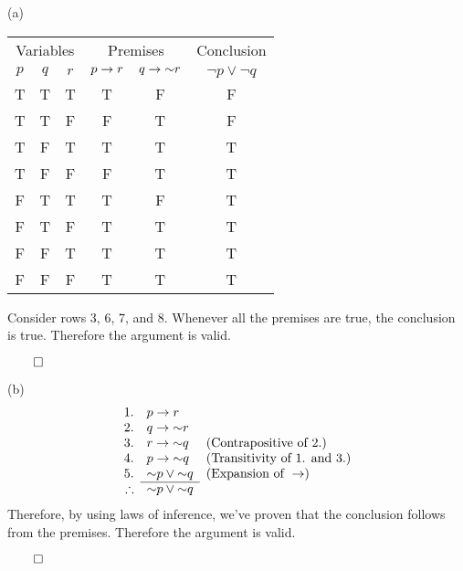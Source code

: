 \documentclass{report}
\begin{document}
\sol (a)
\begin{center}
	\begin{tabular}{|ccc||cc||c|}
		\hline
		\multicolumn{3}{|c||}{Variables} & \multicolumn{2}{c||}{Premises} & \multicolumn{1}{c|}{Conclusion} \\
		$p$ & $q$ & $r$ & $p\rightarrow r$ & $q\rightarrow\mathord{\sim} r$ & $\lnot p\lor\lnot q$ \\ \hline
		T & T & T & T & F & F \\
		T & T & F & F & T & F \\ \cline{4-6}
		T & F & T & T & T & T \\ \cline{4-6}
		T & F & F & F & T & T \\
		F & T & T & T & F & T \\ \cline{4-6}
		F & T & F & T & T & T \\ \cline{4-6}
		F & F & T & T & T & T \\ \cline{4-6}
		F & F & F & T & T & T \\ \cline{4-6} \hline
	\end{tabular}
\end{center}
Consider rows 3, 6, 7, and 8. Whenever all the premises are true, the conclusion is true. Therefore the argument is valid. 
\begin{flushright}$\qed$\\\end{flushright}

\sol (b)
\begin{gather*}
	\argument{
		1. & p\lthen r 			 			& \text{} \\
		2. & q\lthen\lnot r 			& \text{} \\
		3. & r \lthen\lnot q 			& (\text{Contrapositive of 2.}) \\
		4. & p \lthen\lnot q 			& (\text{Transitivity of 1. and 3.}) \\ 
		5. & \lnot p \lor\lnot q	& (\text{Expansion of }\lthen) \\
	}{\lnot p\lor\lnot q & \text{}}				 
\end{gather*}
Therefore, by using laws of inference, we've proven that the conclusion follows from the premises. Therefore the argument is valid.
\begin{flushright}$\qed$\\\end{flushright}
\end{document}
